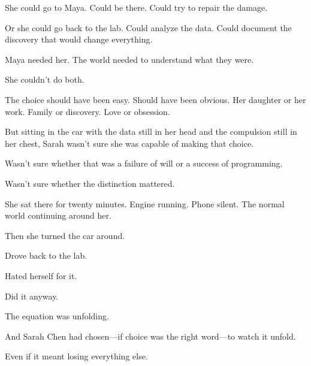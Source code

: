 She could go to Maya. Could be there. Could try to repair the damage.

Or she could go back to the lab. Could analyze the data. Could document the discovery that would change everything.

Maya needed her. The world needed to understand what they were.

She couldn't do both.

The choice should have been easy. Should have been obvious. Her daughter or her work. Family or discovery. Love or obsession.

But sitting in the car with the data still in her head and the compulsion still in her chest, Sarah wasn't sure she was capable of making that choice.

Wasn't sure whether that was a failure of will or a success of programming.

Wasn't sure whether the distinction mattered.

She sat there for twenty minutes. Engine running. Phone silent. The normal world continuing around her.

Then she turned the car around.

Drove back to the lab.

Hated herself for it.

Did it anyway.

The equation was unfolding.

And Sarah Chen had chosen—if choice was the right word—to watch it unfold.

Even if it meant losing everything else.

